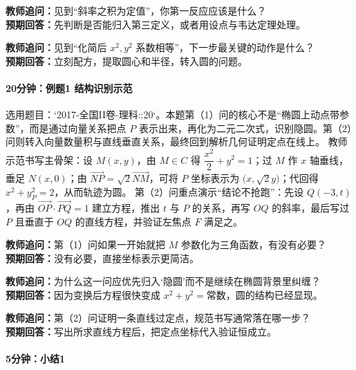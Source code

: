 \documentclass[UTF8,a4paper,11pt]{ctexart}
\begin{document}
\noindent\textbf{教师追问：}见到“斜率之积为定值”，你第一反应应该是什么？\\

\textbf{预期回答：}先判断是否能归入第三定义，或者用设点与韦达定理处理。\par

\noindent\textbf{教师追问：}见到“化简后 $x^2,y^2$ 系数相等”，下一步最关键的动作是什么？\\

\textbf{预期回答：}立刻配方，提取圆心和半径，转入圆的问题。\par

\paragraph{20分钟：例题1 结构识别示范}

选用题目：`2017-全国II卷-理科::20`。本题第（1）问的核心不是“椭圆上动点带参数”，而是通过向量关系把点 $P$ 表示出来，再化为二元二次式，识别隐圆。第（2）问则转入向量数量积与直线垂直关系，最终回到解析几何证明定点在线上。
教师示范书写主骨架：设 $M(x,y)$，由 $M\in C$ 得 $\dfrac{x^2}{2}+y^2=1$；过 $M$ 作 $x$ 轴垂线，垂足 $N(x,0)$；由 $\overrightarrow{NP}=\sqrt{2}\overrightarrow{NM}$，可将 $P$ 坐标表示为 $\bigl(x,\sqrt{2}y\bigr)$；代回得 $x^2+y_P^2=2$，从而轨迹为圆。
第（2）问重点演示“结论不抢跑”：先设 $Q(-3,t)$，再由 $\overrightarrow{OP}\cdot\overrightarrow{PQ}=1$ 建立方程，推出 $t$ 与 $P$ 的关系，再写 $OQ$ 的斜率，最后写过 $P$ 且垂直于 $OQ$ 的直线方程，并验证左焦点 $F$ 满足之。

\noindent\textbf{教师追问：}第（1）问如果一开始就把 $M$ 参数化为三角函数，有没有必要？\\

\textbf{预期回答：}没有必要，直接坐标表示更简洁。\par

\noindent\textbf{教师追问：}为什么这一问应优先归入‘隐圆’而不是继续在椭圆背景里纠缠？\\

\textbf{预期回答：}因为变换后方程很快变成 $x^2+y^2=\text{常数}$，圆的结构已经显现。\par

\noindent\textbf{教师追问：}第（2）问证明一条直线过定点，规范书写通常落在哪一步？\\

\textbf{预期回答：}写出所求直线方程后，把定点坐标代入验证恒成立。\par

\paragraph{5分钟：小结1}
\end{document}
